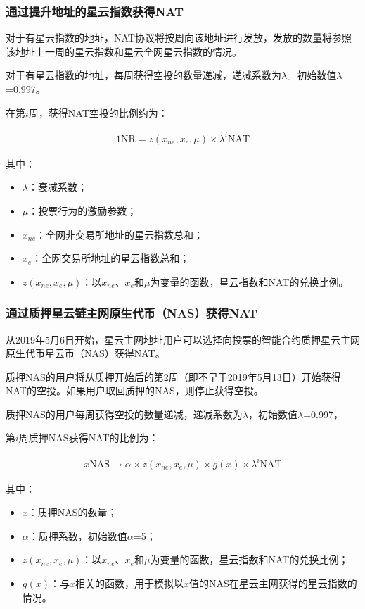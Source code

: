 \subsubsection{通过提升地址的星云指数获得NAT}

对于有星云指数的地址，NAT协议将按周向该地址进行发放，发放的数量将参照该地址上一周的星云指数和星云全网星云指数的情况。

对于有星云指数的地址，每周获得空投的数量递减，递减系数为$\lambda$。初始数值$\lambda$=0.997。

在第$i$周，获得NAT空投的比例约为：

\begin{align}
1 \text{NR}=z(x_{ne},x_{e},\mu)\times\lambda^{i} \text{NAT}
\end{align} 

其中：
\begin{itemize}
	\item $\lambda$：衰减系数；
	\item $\mu$：投票行为的激励参数；
	\item $x_{ne}$：全网非交易所地址的星云指数总和；
	\item $x_{e}$：全网交易所地址的星云指数总和；
	\item $z(x_{ne},x_{e},\mu)$：以$x_{ne}$、$x_{e}$和$\mu$为变量的函数，星云指数和NAT的兑换比例。
\end{itemize}

\subsubsection{通过质押星云链主网原生代币（NAS）获得NAT}

从2019年5月6日开始，星云主网地址用户可以选择向投票的智能合约质押星云主网原生代币星云币（NAS）获得NAT。

质押NAS的用户将从质押开始后的第2周（即不早于2019年5月13日）开始获得NAT的空投。如果用户取回质押的NAS，则停止获得空投。

质押NAS的用户每周获得空投的数量递减，递减系数为$\lambda$，初始数值$\lambda$=0.997，

第$i$周质押NAS获得NAT的比例为： 

\begin{align}
x \text{NAS} \rightarrow \alpha \times z(x_{ne},x_{e},\mu)\times g(x) \times \lambda^{i} \text{NAT}
\end{align}

其中：

\begin{itemize}
	\item $x$：质押NAS的数量；
	\item $\alpha$：质押系数，初始数值$\alpha$=5；
	\item $z(x_{ne},x_{e},\mu)$：以$x_{ne}$、$x_{e}$和$\mu$为变量的函数，星云指数和NAT的兑换比例；
	\item $g(x)$：与$x$相关的函数，用于模拟以$x$值的NAS在星云主网获得的星云指数的情况。
\end{itemize}

